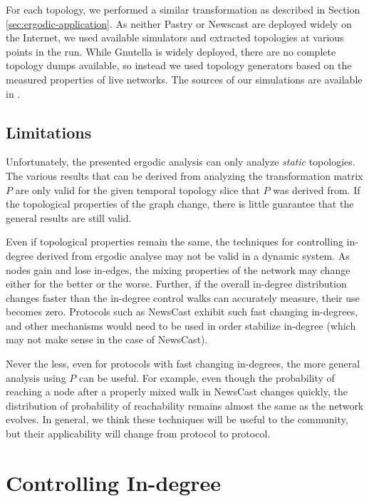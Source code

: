 \documentclass[a4paper,11pt,twocolumn]{article}
\begin{document}
For each topology, we performed a similar transformation as described in
Section \ref{sec:ergodic-application}.  As neither Pastry or Newscast are
deployed widely on the Internet, we used available simulators and extracted
topologies at various points in the run.  While Gnutella is widely deployed,
there are no complete topology dumps available, so instead we used topology
generators based on the measured properties of live networks.  The sources of
our simulations are available in \cite{1,2,3}.  %

\subsection{Limitations}

Unfortunately, the presented ergodic analysis can only analyze \emph{static}
topologies.  The various results that can be derived from analyzing the
transformation matrix $P$ are only valid for the given temporal topology slice
that $P$ was derived from.  If the topological properties of the graph change,
there is little guarantee that the general results are still valid.

Even if topological properties remain the same, the techniques for controlling
in-degree derived from ergodic analyse may not be valid in a dynamic system.
As nodes gain and lose in-edges, the mixing properties of the network may
change either for the better or the worse.  Further, if the overall in-degree
distribution changes faster than the in-degree control walks can accurately
measure, their use becomes zero.  Protocols such as NewsCast exhibit
such fast changing in-degrees, and other mechanisms would need to be used in
order stabilize in-degree (which may not make sense in the case of NewsCast).

Never the less, even for protocols with fast changing in-degrees, the more
general analysis using $P$ can be useful.  For example, even though the
probability of reaching a node after a properly mixed walk in NewsCast changes
quickly, the distribution of probability of reachability remains almost the
same as the network evolves.  %
In general, we think these techniques will be useful to the community, but
their applicability will change from protocol to protocol.

\section{Controlling In-degree}
\end{document}
